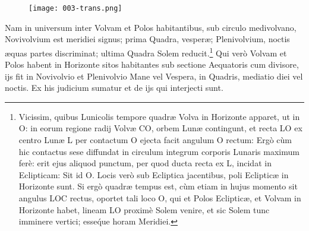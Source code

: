 \documentclass[a4paper, 11pt, oneside, polutonikogreek, german]{article}
\begin{document}
{\begin{figure}[H]
\centering
\texttt{[image: 003-trans.png]}
\end{figure}} Nam in universum inter Volvam et Polos habitantibus, sub circulo medivolvano, Novivolvium est meridiei signus; prima Quadra, vesperæ; Plenivolvium, noctis æquas partes discriminat; ultima Quadra Solem reducit.\footnote{Vicissim, quibus Lunicolis tempore quadræ Volva in Horizonte apparet, ut in O: in eorum regione radij Volvæ CO, orbem Lunæ contingunt, et recta LO ex centro Lunæ L per contactum O ejecta facit angulum O rectum: Ergò cùm hic contactus sese diffundat in circulum integrum corporis Lunaris maximum ferè: erit ejus aliquod punctum, per quod ducta recta ex L, incidat in Eclipticam: Sit id O. Locis verò sub Ecliptica jacentibus, poli Eclipticæ in Horizonte sunt. Si ergò quadræ tempus est, cùm etiam in hujus momento sit angulus LOC rectus, oportet tali loco O, qui et Polos Eclipticæ, et Volvam in Horizonte habet, lineam LO proximè Solem venire, et sic Solem tunc imminere vertici; esse\'que horam Meridiei.} Qui verò Volvam et Polos habent in Horizonte sitos habitantes sub sectione Aequatoris cum divisore, ijs fit in Novivolvio et Plenivolvio Mane vel Vespera, in Quadris, mediatio diei vel noctis. Ex his judicium sumatur et de ijs qui interjecti sunt.
\end{document}
